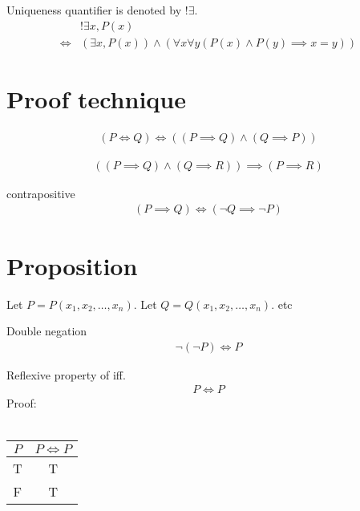 \begin{defn}
\label{Definition:uniqueness_quantifier}
Uniqueness quantifier is denoted by $!\exists$.
\begin{align*}
& !\exists x, P(x) \\
\iff & (\exists x, P(x)) \land (\forall x \forall y (P(x) \land P(y) \implies x = y))
\end{align*}
\end{defn}

\section{Proof technique}
\begin{prop}
\begin{align*}
(P \iff Q) \iff ((P \implies Q) \land (Q \implies P))
\end{align*}
\end{prop}

\begin{prop}
\begin{align*}
((P \implies Q) \land (Q \implies R)) \implies (P \implies R)
\end{align*}
\end{prop}

\begin{prop}
\label{Proposition:contrapositive}
contrapositive
\begin{align*}
(P \implies Q) \iff (\lnot Q \implies \lnot P)
\end{align*}
\end{prop}

\section{Proposition}
Let $P = P(x_1, x_2, \dots, x_n)$.
Let $Q = Q(x_1, x_2, \dots, x_n)$.
etc

\begin{prop}
\label{Proposition:double_negation}
Double negation
\begin{align*}
\lnot (\lnot P) \iff P
\end{align*}
\end{prop}

\begin{prop}
\label{Proposition:iff_reflexive}
Reflexive property of iff.
\begin{align*}
P \iff P
\end{align*}
Proof: \\ \\
\begin{tabular}{|c|c|}
\hline
$P$ & $P \iff P$ \\
\hline
T & T \\
\hline
F & T \\
\hline
\end{tabular}
\end{prop}

